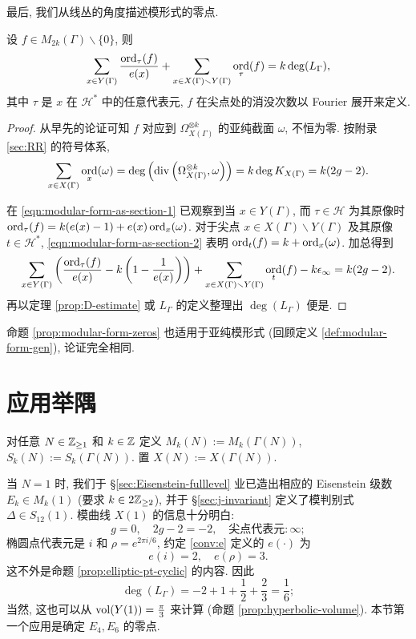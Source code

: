 最后, 我们从线丛的角度描述模形式的零点.
\begin{proposition}\label{prop:modular-form-zeros}
	设 $f \in M_{2k}(\Gamma) \smallsetminus \{0\}$, 则
	\[ \sum_{x \in Y(\Gamma)} \dfrac{\operatorname*{ord}_\tau(f)}{e(x)} + \sum_{x \in X(\Gamma) \smallsetminus Y(\Gamma)} \operatorname*{ord}_\tau(f) = k \deg(L_\Gamma), \]
	其中 $\tau$ 是 $x$ 在 $\mathcal{H}^*$ 中的任意代表元, $f$ 在尖点处的消没次数以 Fourier 展开来定义.
\end{proposition}
\begin{proof}
	从早先的论证可知 $f$ 对应到 $\Omega_{X(\Gamma)}^{\otimes k}$ 的亚纯截面 $\omega$, 不恒为零. 按附录 \ref{sec:RR} 的符号体系,
	\[ \sum_{x \in X(\Gamma)} \operatorname*{ord}_x(\omega) = \deg \left(\operatorname{div}\left( \Omega_{X(\Gamma)}^{\otimes k}, \omega \right)\right) = k \deg K_{X(\Gamma)} = k(2g-2). \]

	在 \eqref{eqn:modular-form-as-section-1} 已观察到当 $x \in Y(\Gamma)$, 而 $\tau \in \mathcal{H}$ 为其原像时 $\operatorname*{ord}_\tau(f) = k(e(x)-1) + e(x) \operatorname*{ord}_x(\omega)$. 对于尖点 $x \in X(\Gamma) \smallsetminus Y(\Gamma)$ 及其原像 $t \in \mathcal{H}^*$, \eqref{eqn:modular-form-as-section-2} 表明 $\operatorname*{ord}_t(f) = k + \operatorname*{ord}_x(\omega)$. 加总得到
	\[ \sum_{x \in Y(\Gamma)} \left( \dfrac{\operatorname*{ord}_\tau(f)}{e(x)} - k\left( 1 - \dfrac{1}{e(x)} \right)\right) + \sum_{x \in X(\Gamma) \smallsetminus Y(\Gamma)} \operatorname*{ord}_t(f) - k \epsilon_\infty = k(2g - 2). \]
	再以定理 \ref{prop:D-estimate} 或 $L_\Gamma$ 的定义整理出 $\deg(L_\Gamma)$ 便是.
\end{proof}

命题 \ref{prop:modular-form-zeros} 也适用于亚纯模形式 (回顾定义 \ref{def:modular-form-gen}), 论证完全相同.

\section{应用举隅}\label{sec:dimension-full}
对任意 $N \in \mathbb{Z}_{\geq 1}$ 和 $k \in \mathbb{Z}$ 定义 $M_k(N) := M_k(\Gamma(N))$, $S_k(N) := S_k(\Gamma(N))$. 置 $X(N) := X(\Gamma(N))$.

当 $N=1$ 时, 我们于 \S\ref{sec:Eisenstein-fulllevel} 业已造出相应的 Eisenstein 级数 $E_k \in M_k(1)$ (要求 $k \in 2\mathbb{Z}_{\geq 2}$), 并于 \S\ref{sec:j-invariant} 定义了模判别式 $\Delta \in S_{12}(1)$. 模曲线 $X(1)$ 的信息十分明白:
\[ g = 0, \quad 2g - 2 = -2, \quad \text{尖点代表元}: \infty; \]
椭圆点代表元是 $i$ 和 $\rho = e^{2\pi i/6}$, 约定 \ref{conv:e} 定义的 $e(\cdot)$ 为
\[ e(i) = 2, \quad e(\rho) = 3. \]
这不外是命题 \ref{prop:elliptic-pt-cyclic} 的内容. 因此
\[ \deg(L_\Gamma) = -2 + 1 + \frac{1}{2} + \frac{2}{3} = \frac{1}{6}; \]
当然, 这也可以从 $\operatorname{vol}(Y(1)) = \frac{\pi}{3}$ 来计算 (命题 \ref{prop:hyperbolic-volume}). 本节第一个应用是确定 $E_4, E_6$ 的零点.

